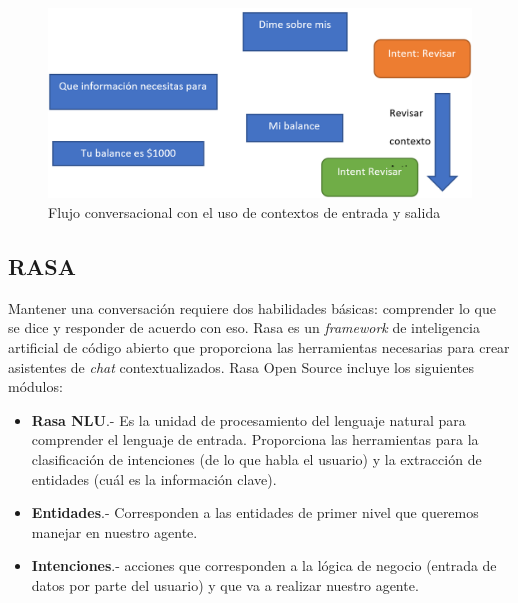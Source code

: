 \documentclass[letter, openright, 12pt]{book}
\begin{document}
\begin{figure}[H]
\includegraphics[width=1\textwidth]{figura2_4}
\caption{Flujo conversacional con el uso de contextos de entrada y salida}
\label{tab:figura2_4} 
\end{figure}

\subsection{RASA}
Mantener una conversación requiere dos habilidades básicas: comprender lo que se dice y responder de acuerdo con eso. Rasa es un \textit{framework} de inteligencia artificial de código abierto  que proporciona las herramientas necesarias para crear asistentes de \textit{chat} contextualizados. Rasa Open Source incluye los siguientes módulos:

\begin{itemize}
\item \textbf{Rasa NLU}.- Es la unidad de procesamiento del lenguaje natural para comprender el lenguaje de entrada. Proporciona las herramientas para la clasificación de intenciones (de lo que habla el usuario) y la extracción de entidades (cuál es la información clave).
\item \textbf{Entidades}.- Corresponden a las entidades de primer nivel que queremos manejar en nuestro agente. 
\item \textbf{Intenciones}.- acciones que corresponden a la lógica de negocio (entrada de datos por parte del usuario) y que va a realizar nuestro agente.
\end{itemize}
\end{document}
